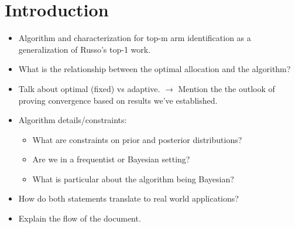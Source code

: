 \newcommand{\package}{\emph}

\chapter{Introduction}

\begin{itemize}
  \item Algorithm and characterization for top-m arm identification as a generalization of Russo's top-1 work.
  \item What is the relationship between the optimal allocation and the algorithm?
  \item Talk about optimal (fixed) vs adaptive.
  $\rightarrow$ Mention the the outlook of proving convergence based on results
  we've established.
  \item Algorithm details/constraints:
  \begin{itemize}
    \item What are constraints on prior and posterior distributions?
    \item Are we in a frequentist or Bayesian setting?
    \item What is particular about the algorithm being Bayesian?
  \end{itemize}
  \item How do both statements translate to real world applications?
  \item Explain the flow of the document.
\end{itemize}

